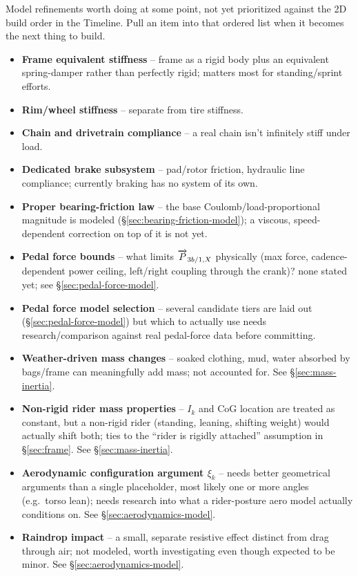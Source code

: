 \begin{aiblock}
Model refinements worth doing at some point, not yet prioritized against the 2D build order in the Timeline. Pull an item into that ordered list when it becomes the next thing to build.
\begin{itemize}
    \item \textbf{Frame equivalent stiffness} -- frame as a rigid body plus an equivalent spring-damper rather than perfectly rigid; matters most for standing/sprint efforts.
    \item \textbf{Rim/wheel stiffness} -- separate from tire stiffness.
    \item \textbf{Chain and drivetrain compliance} -- a real chain isn't infinitely stiff under load.
    \item \textbf{Dedicated brake subsystem} -- pad/rotor friction, hydraulic line compliance; currently braking has no system of its own.
    \item \textbf{Proper bearing-friction law} -- the base Coulomb/load-proportional magnitude is modeled (\S\ref{sec:bearing-friction-model}); a viscous, speed-dependent correction on top of it is not yet.
    \item \textbf{Pedal force bounds} -- what limits $\overrightarrow{P}_{3b/1,X}$ physically (max force, cadence-dependent power ceiling, left/right coupling through the crank)? none stated yet; see \S\ref{sec:pedal-force-model}.
    \item \textbf{Pedal force model selection} -- several candidate tiers are laid out (\S\ref{sec:pedal-force-model}) but which to actually use needs research/comparison against real pedal-force data before committing.
    \item \textbf{Weather-driven mass changes} -- soaked clothing, mud, water absorbed by bags/frame can meaningfully add mass; not accounted for. See \S\ref{sec:mass-inertia}.
    \item \textbf{Non-rigid rider mass properties} -- $I_k$ and CoG location are treated as constant, but a non-rigid rider (standing, leaning, shifting weight) would actually shift both; ties to the ``rider is rigidly attached'' assumption in \S\ref{sec:frame}. See \S\ref{sec:mass-inertia}.
    \item \textbf{Aerodynamic configuration argument $\xi_k$} -- needs better geometrical arguments than a single placeholder, most likely one or more angles (e.g.\ torso lean); needs research into what a rider-posture aero model actually conditions on. See \S\ref{sec:aerodynamics-model}.
    \item \textbf{Raindrop impact} -- a small, separate resistive effect distinct from drag through air; not modeled, worth investigating even though expected to be minor. See \S\ref{sec:aerodynamics-model}.

\end{itemize}
\end{aiblock}
